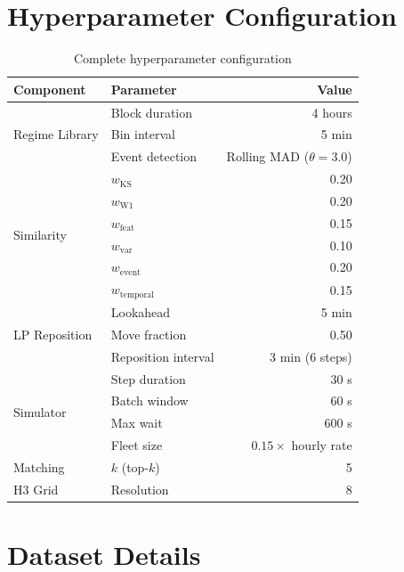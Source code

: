 \documentclass[conference,10pt]{IEEEtran}
\begin{document}
\appendix

\section{Hyperparameter Configuration}
\label{app:hyperparams}

\begin{table}[h]
  \centering
  \caption{Complete hyperparameter configuration}
  \label{tab:hyperparams}
  \begin{tabular}{@{}llr@{}}
    \toprule
    Component & Parameter & Value \\
    \midrule
    \multirow{3}{*}{Regime Library}
      & Block duration & 4 hours \\
      & Bin interval & 5 min \\
      & Event detection & Rolling MAD ($\theta=3.0$) \\
    \midrule
    \multirow{6}{*}{Similarity}
      & $w_\text{KS}$ & 0.20 \\
      & $w_\text{W1}$ & 0.20 \\
      & $w_\text{feat}$ & 0.15 \\
      & $w_\text{var}$ & 0.10 \\
      & $w_\text{event}$ & 0.20 \\
      & $w_\text{temporal}$ & 0.15 \\
    \midrule
    \multirow{3}{*}{LP Reposition}
      & Lookahead & 5 min \\
      & Move fraction & 0.50 \\
      & Reposition interval & 3 min (6 steps) \\
    \midrule
    \multirow{4}{*}{Simulator}
      & Step duration & 30 s \\
      & Batch window & 60 s \\
      & Max wait & 600 s \\
      & Fleet size & $0.15 \times$ hourly rate \\
    \midrule
    Matching & $k$ (top-$k$) & 5 \\
    \midrule
    H3 Grid & Resolution & 8 \\
    \bottomrule
  \end{tabular}
\end{table}


\section{Dataset Details}
\label{app:datasets}
\end{document}
